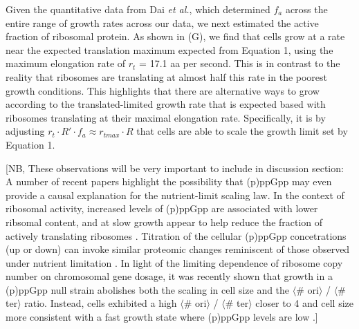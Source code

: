 Given the quantitative data from Dai \textit{et al.}, which determined $f_a$
across the entire range of growth rates across our data, we next estimated the
active fraction of ribosomal protein. As shown in (G), we
find that cells grow at a rate near the expected translation maximum expected
from Equation 1, using the maximum elongation rate of $r_t$ = 17.1 aa per
second. This is in contrast to the reality that ribosomes are translating at
almost half this rate in the poorest growth conditions. This highlights that
there are alternative ways to grow according to the translated-limited growth
rate that is expected based with ribosomes translating at their maximal
elongation rate. Specifically, it is by adjusting $r_t \cdot R' \cdot f_a
\approx r_{tmax} \cdot R$ that cells are able to scale the growth limit set by
Equation 1.

[NB, These observations will be very important to include in
discussion section: A number of recent papers highlight the possibility that
(p)ppGpp may even provide a causal explanation for the nutrient-limit scaling
law. In the context of ribosomal activity, increased levels of (p)ppGpp are
associated with lower ribsomal content, and at slow growth appear to help reduce
the fraction of actively translating ribosomes \citep{dai2016, dai2018}.
Titration of the cellular (p)ppGpp concetrations (up or down) can invoke similar
proteomic changes reminiscent of those observed under nutrient limitation
\citep{zhu2019}. In light of the limiting dependence of ribosome copy number on
chromosomal gene dosage, it was recently shown that growth in a (p)ppGpp  null
strain abolishes both the scaling in cell size  and the $\langle$\# ori$\rangle$
/ $\langle$\# ter$\rangle$ ratio. Instead, cells exhibited a high $\langle$\#
ori$\rangle$ / $\langle$\# ter$\rangle$ closer to 4 and cell size more
consistent with a fast growth state where (p)ppGpp levels are low
\citep{fernandezcoll2020}.]




